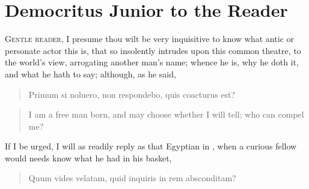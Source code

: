 \chapter{Democritus Junior to the Reader}
{\lettrine[lines=4,findent=5pt,nindent=0pt]{G}{entle reader}, I presume thou wilt be very inquisitive to know what
antic or personate actor this is, that so insolently intrudes upon this
common theatre, to the world's view, arrogating another man's name;
whence he is, why he doth it, and what he hath to say; although, as
he said,
\begin{latin}
\begin{quote}
Primum si noluero, non respondebo, quis coacturus est?
\end{quote}%
\end{latin}
\translationrule%
\begin{quote}
I am a free man born, and may choose whether I will tell; who can compel me?
\end{quote}

If I be urged, I will as readily reply as that Egyptian in ,
when a curious fellow would needs know what he had in his basket,

\begin{latin}
\begin{quote}
Quum vides velatam, quid inquiris in rem absconditam?
\end{quote}
\end{latin}

}
